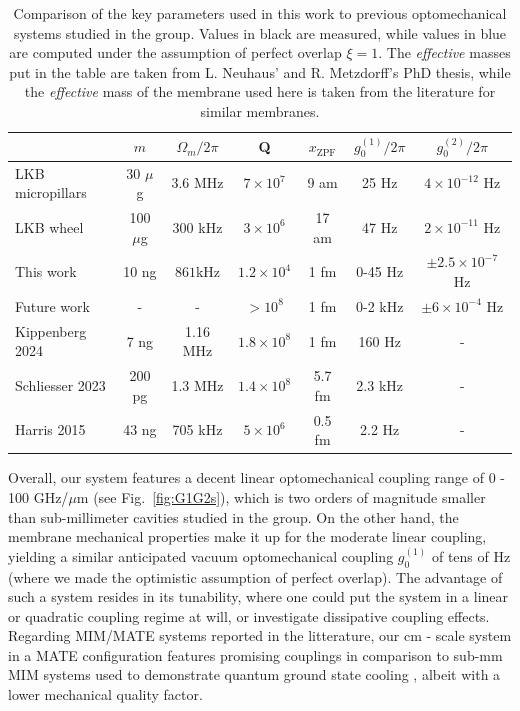 \begin{table}[h!]
    \centering
    \captionsetup{width=1\linewidth}
    \begin{tabular}{lcccccc}
         & $m$  & $\Omega_m/2\pi$  &  Q  & $x_{\text{ZPF}}$ &  $g_0^{(1)}/2\pi$  &  $g_0^{(2)}/2\pi$ \\ 
        \hline 
        LKB micropillars  & 30 $\mu$g &  3.6 MHz & $7\times 10^7$ & 9 am & \color{blue} 25 Hz &  \color{blue}$4\times10^{-12}$ Hz\\
        LKB wheel & 100 $\mu$g & 300 kHz & $3\times 10^6$ & 17 am  & \color{blue} 47 Hz & \color{blue}$2\times10^{-11}$ Hz\\
        This work  & 10 ng & $ 861$kHz & $1.2\times10^4$ & 1 fm & \color{blue}0-45 Hz & \color{blue}$\pm 2.5\times10^{-7}$ Hz\\
        Future work & - & - & $>10^8$ & 1 fm & \color{blue}0-2 kHz & \color{blue} $\pm 6 \times 10^{-4}$ Hz \\
        \hline 
        Kippenberg 2024 \cite{Kippenberg_2024} & 7 ng &  1.16 MHz & $1.8\times10^8$ & 1 fm & 160 Hz &  - \\
        Schliesser 2023 \cite{Schliesser_2019} & 200 pg &  1.3 MHz & $1.4 \times 10^8$ & 5.7 fm &  2.3 kHz & -  \\
        Harris 2015 \cite{Underwood_2015} & 43 ng &  705 kHz & $5\times 10^6$ & 0.5 fm & 2.2 Hz & -  \\
    \end{tabular}
    \caption{Comparison of the key parameters used in this work to previous optomechanical systems studied in the group. Values in black are measured, while values in blue are computed under the assumption of perfect overlap $\xi = 1$. The \textit{effective} masses put in the table are taken from L. Neuhaus' and R. Metzdorff's PhD thesis, while the \textit{effective} mass of the membrane used here is taken from the literature for similar membranes.}
    \label{tab:mate_parameters_comparison}
\end{table}


Overall, our system features a decent linear optomechanical coupling range of 0 - 100 GHz/$\mu$m (see Fig.~\ref{fig:G1G2s}), which is two orders of magnitude smaller than sub-millimeter cavities studied in the group. On the other hand, the membrane mechanical properties make it up for the moderate linear coupling, yielding a similar anticipated vacuum optomechanical coupling $g_0^{(1)}$ of tens of Hz (where we made the optimistic assumption of perfect overlap). The advantage of such a system resides in its tunability, where one could put the system in a linear or quadratic coupling regime at will, or investigate dissipative coupling effects. Regarding MIM/MATE systems reported in the litterature, our cm - scale system in a MATE configuration features promising couplings in comparison to sub-mm MIM systems used to demonstrate quantum ground state cooling \cite{Schliesser_2019, Kippenberg_2024}, albeit with a lower mechanical quality factor.  \\ 

